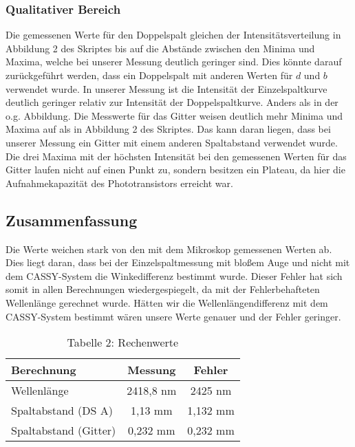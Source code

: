 \documentclass[11pt]{article}
\begin{document}
\subsubsection{Qualitativer Bereich}
Die gemessenen Werte für den Doppelspalt gleichen der Intensitätsverteilung in Abbildung 2 des Skriptes bis auf die Abstände zwischen den Minima und Maxima, welche bei unserer Messung deutlich geringer sind. Dies könnte darauf zurückgeführt werden, dass ein Doppelspalt mit anderen Werten für $d$ und $b$ verwendet wurde. In unserer Messung ist die Intensität der Einzelspaltkurve deutlich geringer relativ zur Intensität der Doppelspaltkurve. Anders als in der o.g. Abbildung. Die Messwerte für das Gitter weisen deutlich mehr Minima und Maxima auf als in Abbildung 2 des Skriptes. Das kann daran liegen, dass bei unserer Messung ein Gitter mit einem anderen Spaltabstand verwendet wurde. Die drei Maxima mit der höchsten Intensität bei den gemessenen Werten für das Gitter laufen nicht auf einen Punkt zu, sondern besitzen ein Plateau, da hier die Aufnahmekapazität des Phototransistors erreicht war.

\subsection{Zusammenfassung}
Die Werte weichen stark von den mit dem Mikroskop gemessenen Werten ab. Dies liegt daran, dass bei der Einzelspaltmessung mit bloßem Auge und nicht mit dem CASSY-System die Winkedifferenz bestimmt wurde. Dieser Fehler hat sich somit in allen Berechnungen wiedergespiegelt, da mit der Fehlerbehafteten Wellenlänge gerechnet wurde. Hätten wir die Wellenlängendifferenz mit dem CASSY-System bestimmt wären unsere Werte genauer und der Fehler geringer.

\begin{table}[h]
\centering
\begin{tabular}{l|cc}
Berechnung & Messung & Fehler\\
\hline
Wellenlänge & 2418,8 nm & 2425 nm\\
Spaltabstand (DS A) & 1,13 mm & 1,132 mm\\
Spaltabstand (Gitter) & 0,232 mm & 0,232 mm\\
\end{tabular}
\caption{Tabelle 2: Rechenwerte}
\end{table}
\end{document}
